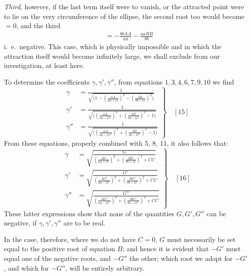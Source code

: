 \textit{Third}, however, if the last term itself were to vanish, or the attracted point were to lie on the very circumference of the ellipse, the second root too would become \(=0\), and the third
\[
\begin{aligned}
&=-\frac{bbAA}{aa}-\frac{aaBB}{bb}
\end{aligned}
\]
i.\ e.\ negative. This case, which is physically impossible and in which the attraction itself would become infinitely large, we shall exclude from our investigation, at least here.


To determine the coefficients \(\gamma,\gamma',\gamma''\), from equations \(1,3,4,6,7,9,10\) we find
\[
\left.\begin{aligned}
\gamma&=\frac{1}{\surd{\bigl(1-(\frac{aA}{aa+G})^2-(\frac{bB}{bb+G})^2\bigr)}}\\[9pt]
\gamma'&=\frac{1}{\surd{\bigl((\frac{aA}{aa-G'})^2+(\frac{bB}{bb-G'})^2-1\bigr)}}\\[9pt]
\gamma''&=\frac{1}{\surd{\bigl((\frac{aA}{aa-G''})^2+(\frac{bB}{bb-G''})^2-1\bigr)}}
\end{aligned}\right\}\quad[15]
\]
From these equations, properly combined with 5, 8, 11, it also follows that:
\[
\left.\begin{aligned}
\gamma&=\surd{\frac{G}{(\frac{AG}{aa+G})^2+(\frac{BG}{bb+G})^2+CC}}\\[9pt]
\gamma'&=\surd{\frac{G'}{(\frac{AG'}{aa-G'})^2+(\frac{BG'}{bb-G'})^2+CC}}\\[9pt]
\gamma''&=\surd{\frac{G''}{(\frac{AG''}{aa-G''})^2+(\frac{BG''}{bb-G''})^2+CC}}
\end{aligned}\right\}\quad[16]
\]
These latter expressions show that none of the quantities $G,G',G''$ can be negative, if $\gamma,\gamma',\gamma''$ are to be real.

In the case, therefore, where we do not have $C=0$, $G$ must necessarily be set equal to the positive root of equation $B$; and hence it is evident that $-G'$ must equal one of the negative roots, and $-G''$ the other; which root we adopt for $-G'$, and which for $-G''$, will be entirely arbitrary.

